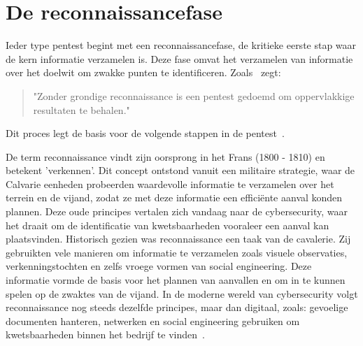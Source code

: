 \section{De reconnaissancefase}
Ieder type pentest begint met een reconnaissancefase, de kritieke eerste stap waar de kern informatie verzamelen is. 
Deze fase omvat het verzamelen van informatie over het doelwit om zwakke punten te identificeren. 
Zoals~\textcite{Shah} zegt: \begin{quote}"Zonder grondige reconnaissance is een pentest gedoemd om oppervlakkige resultaten te behalen." \end{quote}
Dit proces legt de basis voor de volgende stappen in de pentest~\autocite{Kothia}.

De term reconnaissance vindt zijn oorsprong in het Frans (1800 - 1810) en betekent 'verkennen'. 
Dit concept ontstond vanuit een militaire strategie, waar de Calvarie eenheden probeerden waardevolle informatie te verzamelen over het terrein en de vijand, zodat ze met deze informatie een efficiënte aanval konden plannen.
Deze oude principes vertalen zich vandaag naar de cybersecurity, waar het draait om de identificatie van kwetsbaarheden vooraleer een aanval kan plaatsvinden.
Historisch gezien was reconnaissance een taak van de cavalerie. Zij gebruikten vele manieren om informatie te verzamelen zoals visuele observaties, verkenningstochten en zelfs vroege vormen van social engineering. 
Deze informatie vormde de basis voor het plannen van aanvallen en om in te kunnen spelen op de zwaktes van de vijand.
In de moderne wereld van cybersecurity volgt reconnaissance nog steeds dezelfde principes, maar dan digitaal, zoals: gevoelige documenten hanteren, netwerken en social engineering gebruiken om kwetsbaarheden binnen het bedrijf te vinden~\autocite{Joseph2013}.

